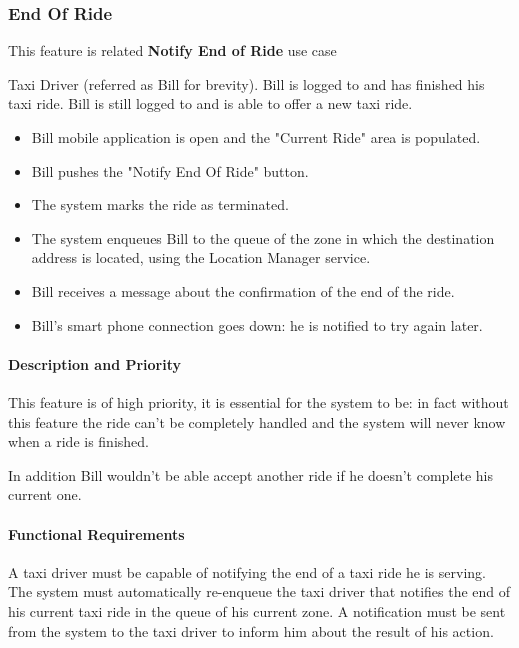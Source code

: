 \subsubsection{End Of Ride}
This feature is related \textbf{Notify End of Ride} use case
\begin{itemize}
	 Taxi Driver (referred as Bill for brevity).
	 Bill is logged to \myTaxiService{} and has finished his taxi ride.
	 Bill is still logged to \myTaxiService{} and is able to offer a new taxi ride.
	\begin{itemize}
		\item Bill \myTaxiService{} mobile application is open and the "Current Ride" area is populated.
		\item Bill pushes the "Notify End Of Ride" button.
		\item The system marks the ride as terminated.
		\item The system enqueues Bill to the queue of the zone in which the destination address is located, using the Location Manager service.
		\item Bill receives a message about the confirmation of the end of the ride. 
	\end{itemize}
	\begin{itemize}
		\item Bill's smart phone connection goes down: he is notified to try again later.
	\end{itemize}
\end{itemize}
\paragraph{Description and Priority}
This feature is of high priority, it is essential for the system to be: in fact without this feature the ride can't be completely handled and the system will never know when a ride is finished.\par In addition Bill wouldn't be able accept another ride if he doesn't complete his current one.
\paragraph{Functional Requirements}
\begin{itemize}
	 A taxi driver must be capable of notifying the end of a taxi ride he is serving.
	 The system must automatically re-enqueue the taxi driver that notifies the end of his current taxi ride in the queue of his current zone.
	 A notification must be sent from the system to the taxi driver to inform him about the result of his action.
\end{itemize}
